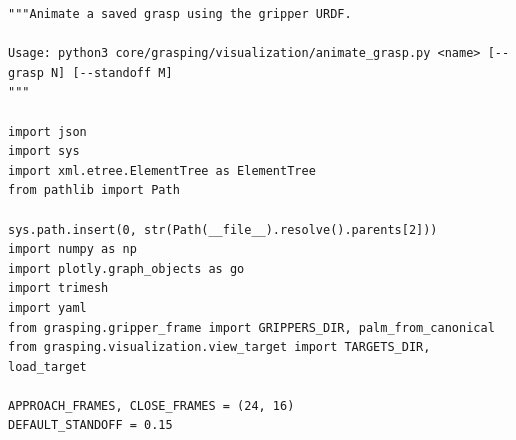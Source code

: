\documentclass[11pt,a4paper]{book}
\begin{document}
\begin{lstlisting}[firstnumber=1]
"""Animate a saved grasp using the gripper URDF.

Usage: python3 core/grasping/visualization/animate_grasp.py <name> [--grasp N] [--standoff M]
"""

import json
import sys
import xml.etree.ElementTree as ElementTree
from pathlib import Path

sys.path.insert(0, str(Path(__file__).resolve().parents[2]))
import numpy as np
import plotly.graph_objects as go
import trimesh
import yaml
from grasping.gripper_frame import GRIPPERS_DIR, palm_from_canonical
from grasping.visualization.view_target import TARGETS_DIR, load_target

APPROACH_FRAMES, CLOSE_FRAMES = (24, 16)
DEFAULT_STANDOFF = 0.15


\end{lstlisting}
\end{document}
